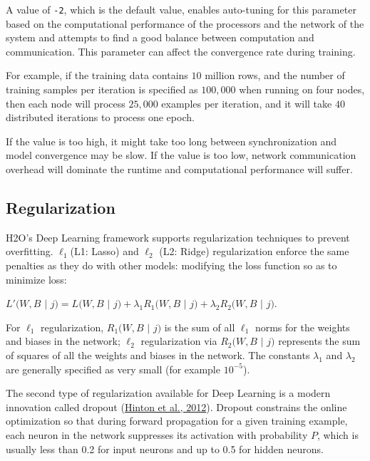 A value of \texttt{-2}, which is the default value, enables auto-tuning for this parameter based on the computational performance of the processors and the network of the system and attempts to find a good balance between computation and communication. This parameter can affect the convergence rate during training.

For example, if the training data contains $10$ million rows, and the number of training samples per iteration is specified as $100,000$ when running on four nodes, then each node will process $25,000$ examples per iteration, and it will take $40$ distributed iterations to process one epoch. 

If the value is too high, it might take too long between synchronization and model convergence may be slow.  If the value is too low, network communication overhead will dominate the runtime and computational performance will suffer. 


\newpage
\subsection{Regularization} 
\label{ssec:Regularization}
H2O's Deep Learning framework supports regularization techniques to prevent overfitting.  $\ell_1$(L1: Lasso) and $\ell_2$ (L2: Ridge) regularization enforce the same penalties as they do with other models: modifying the loss function so as to minimize loss: %
\medskip
\begin{center}
$L'(W,B$ $|$ $j) = L(W,B$ $|$ $j) + \lambda_1 R_1(W,B$ $|$ $j) + \lambda_2 R_2(W,B$ $|$ $j)$.
\end{center}
\medskip
For $\ell_1$ regularization, $R_1(W,B$ $|$ $j)$ is the sum of all $\ell_1$ norms for the weights and biases in the network; $\ell_2$ regularization via $R_2(W,B$ $|$ $j)$ represents the sum of squares of all the weights and biases in the network. The constants $\lambda_1$ and $\lambda_2$ are generally specified as very small (for example $10^{-5}$).

The second type of regularization available for Deep Learning is a modern innovation called dropout (\href{http://arxiv.org/pdf/1207.0580.pdf}{Hinton et al., 2012}). %
Dropout constrains the online optimization so that during forward propagation for a given training example, each neuron in the network suppresses its activation with probability $P$, which is usually less than 0.2 for input neurons and up to 0.5 for hidden neurons. 

